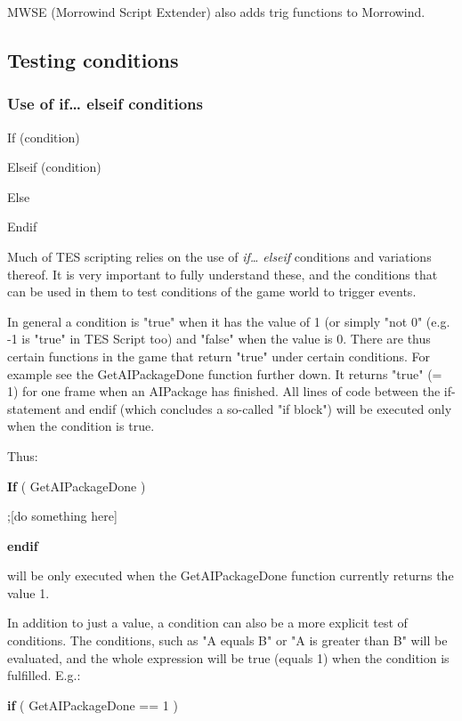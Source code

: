 \documentclass[
]{article}
\begin{document}
MWSE (Morrowind Script Extender) also adds trig functions to Morrowind.

\protect\hypertarget{_Toc182634504}{}{}

\hypertarget{testing-conditions}{%
\subsection{Testing conditions}\label{testing-conditions}}

\hypertarget{use-of-if-elseif-conditions}{%
\subsubsection{Use of if\ldots{} elseif
conditions}\label{use-of-if-elseif-conditions}}

If (condition)

Elseif (condition)

Else

Endif

Much of TES scripting relies on the use of \emph{if\ldots{} elseif}
conditions and variations thereof. It is very important to fully
understand these, and the conditions that can be used in them to test
conditions of the game world to trigger events.

In general a condition is "true" when it has the value of 1 (or simply
"not 0" (e.g. -1 is "true" in TES Script too) and "false" when the value
is 0. There are thus certain functions in the game that return "true"
under certain conditions. For example see the GetAIPackageDone function
further down. It returns "true" (= 1) for one frame when an AIPackage
has finished. All lines of code between the if-statement and endif
(which concludes a so-called "if block") will be executed only when the
condition is true.

Thus:

\textbf{If} ( GetAIPackageDone )

;{[}do something here{]}

\textbf{endif}

will be only executed when the GetAIPackageDone function currently
returns the value 1.

In addition to just a value, a condition can also be a more explicit
test of conditions. The conditions, such as "A equals B" or "A is
greater than B" will be evaluated, and the whole expression will be true
(equals 1) when the condition is fulfilled. E.g.:

\textbf{if} ( GetAIPackageDone == 1 )
\end{document}
